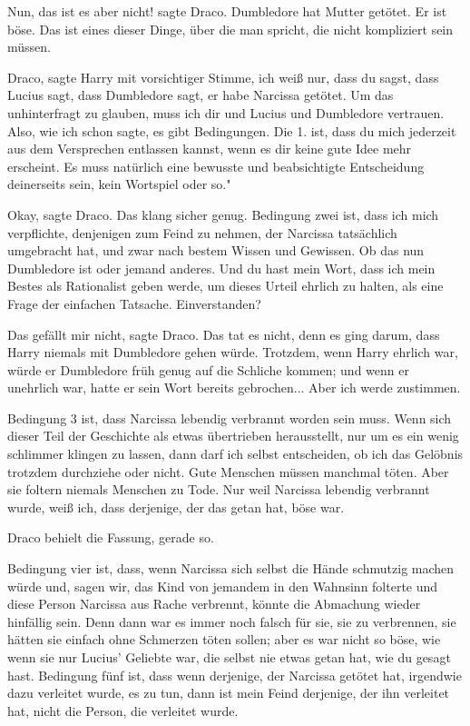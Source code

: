 \glqq{}Nun, das ist es aber nicht!\grqq{} sagte Draco. \glqq{}Dumbledore hat
Mutter getötet. Er ist böse. Das ist eines dieser Dinge, über die man spricht,
die nicht kompliziert sein müssen.\grqq{}

\glqq{}Draco\grqq{}, sagte Harry mit vorsichtiger Stimme, \glqq{}ich weiß nur,
dass du sagst, dass Lucius sagt, dass Dumbledore sagt, er habe Narcissa getötet.
Um das unhinterfragt zu glauben, muss ich dir und Lucius und Dumbledore
vertrauen. Also, wie ich schon sagte, es gibt Bedingungen. Die 1. ist, dass du
mich jederzeit aus dem Versprechen entlassen kannst, wenn es dir keine gute Idee
mehr erscheint. Es muss natürlich eine bewusste und beabsichtigte Entscheidung
deinerseits sein, kein Wortspiel oder so."

\glqq{}Okay\grqq{}, sagte Draco. Das klang sicher genug. \glqq{}Bedingung zwei
ist, dass ich mich verpflichte, denjenigen zum Feind zu nehmen, der Narcissa
tatsächlich umgebracht hat, und zwar nach bestem Wissen und Gewissen. Ob das nun
Dumbledore ist oder jemand anderes. Und du hast mein Wort, dass ich mein Bestes
als Rationalist geben werde, um dieses Urteil ehrlich zu halten, als eine Frage
der einfachen Tatsache. Einverstanden?\grqq{}

\glqq{}Das gefällt mir nicht\grqq{}, sagte Draco. Das tat es nicht, denn es ging
darum, dass Harry niemals mit Dumbledore gehen würde. Trotzdem, wenn Harry
ehrlich war, würde er Dumbledore früh genug auf die Schliche kommen; und wenn er
unehrlich war, hatte er sein Wort bereits gebrochen... \glqq{}Aber ich werde
zustimmen.\grqq{}

\glqq{}Bedingung 3 ist, dass Narcissa lebendig verbrannt worden sein muss. Wenn
sich dieser Teil der Geschichte als etwas übertrieben herausstellt, nur um es
ein wenig schlimmer klingen zu lassen, dann darf ich selbst entscheiden, ob ich
das Gelöbnis trotzdem durchziehe oder nicht. Gute Menschen müssen manchmal
töten. Aber sie foltern niemals Menschen zu Tode. Nur weil Narcissa lebendig
verbrannt wurde, weiß ich, dass derjenige, der das getan hat, böse war.\grqq{}

Draco behielt die Fassung, gerade so.

\glqq{}Bedingung vier ist, dass, wenn Narcissa sich selbst die Hände schmutzig
machen würde und, sagen wir, das Kind von jemandem in den Wahnsinn folterte und
diese Person Narcissa aus Rache verbrennt, könnte die Abmachung wieder hinfällig
sein. Denn dann war es immer noch falsch für sie, sie zu verbrennen, sie hätten
sie einfach ohne Schmerzen töten sollen; aber es war nicht so böse, wie wenn sie
nur Lucius' Geliebte war, die selbst nie etwas getan hat, wie du gesagt hast.
Bedingung fünf ist, dass wenn derjenige, der Narcissa getötet hat, irgendwie
dazu verleitet wurde, es zu tun, dann ist mein Feind derjenige, der ihn
verleitet hat, nicht die Person, die verleitet wurde.\grqq{}

